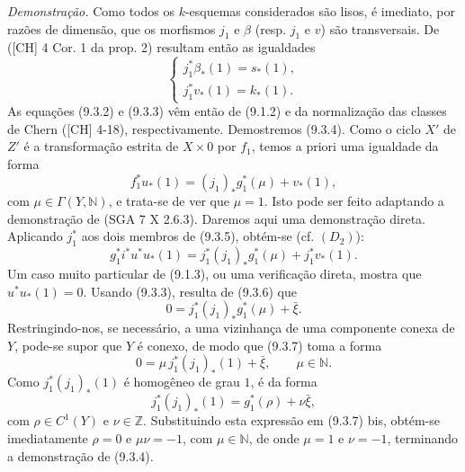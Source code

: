 \emph{Demonstração.} Como todos os $k$-esquemas considerados são lisos, é imediato, por razões de dimensão, que os morfismos $j_1$ e $\beta$ (resp. $j_1$ e $v$) são transversais. De ([CH] 4 Cor. 1 da prop. 2) resultam então as igualdades
\[
\begin{cases}
j_1^*\beta_*(1)=s_*(1),\\
j_1^*v_*(1)=k_*(1).
\end{cases}
\]
As equações (9.3.2) e (9.3.3) vêm então de (9.1.2) e da normalização das classes de Chern ([CH] 4-18), respectivamente. Demostremos (9.3.4). Como o ciclo $X'$ de $Z'$ é a transformação estrita de $X\times0$ por $f_1$, temos a priori uma igualdade da forma
\[
f_1^*u_*(1)=(j_1)_*g_1^*(\mu)+v_*(1),
\tag{9.3.5}
\]
com $\mu\in\Gamma(Y,\mathbb N)$, e trata-se de ver que $\mu=1$. Isto pode ser feito adaptando a demonstração de (SGA 7 X 2.6.3). Daremos aqui uma demonstração direta. Aplicando $j_1^*$ aos dois membros de (9.3.5), obtém-se (cf. $(D_2)$):
\[
g_1^*i^*u^*u_*(1)=j_1^*(j_1)_*g_1^*(\mu)+j_1^*v_*(1).
\tag{9.3.6}
\]
Um caso muito particular de (9.1.3), ou uma verificação direta, mostra que $u^*u_*(1)=0$. Usando (9.3.3), resulta de (9.3.6) que
\[
0=j_1^*(j_1)_*g_1^*(\mu)+\bar\xi.
\tag{9.3.7}
\]
Restringindo-nos, se necessário, a uma vizinhança de uma componente conexa de $Y$, pode-se supor que $Y$ é conexo, de modo que (9.3.7) toma a forma
\[
0=\mu\,j_1^*(j_1)_*(1)+\bar\xi,\qquad \mu\in\mathbb N.
\tag*{(9.3.7) bis}
\]
Como $j_1^*(j_1)_*(1)$ é homogêneo de grau $1$, é da forma
\[
j_1^*(j_1)_*(1)=g_1^*(\rho)+\nu\bar\xi,
\]
com $\rho\in C^1(Y)$ e $\nu\in\mathbb Z$. Substituindo esta expressão em (9.3.7) bis, obtém-se imediatamente $\rho=0$ e $\mu\nu=-1$, com $\mu\in\mathbb N$, de onde $\mu=1$ e $\nu=-1$, terminando a demonstração de (9.3.4).
